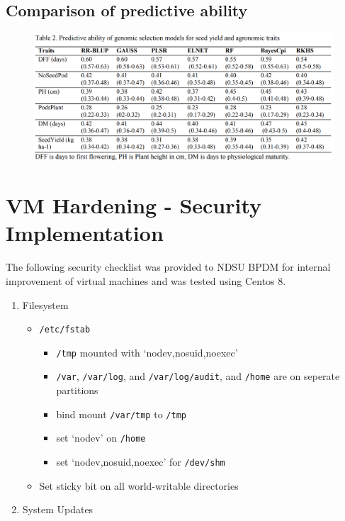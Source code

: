 \documentclass[12pt, letterpaper,oneocolumn]{article}
\begin{document}
\begin{appendices}
\subsection{Comparison of predictive ability}
\begin{center}
	\begin{figure}[H]
	\includegraphics[width=\linewidth]{table2.png}
		\end{figure}
\end{center}


\section{VM Hardening - Security Implementation}
The following security checklist was provided to NDSU BPDM for internal improvement of virtual machines and was tested using Centos 8.

\begin{enumerate}
\def\labelenumi{\arabic{enumi}.}
\item
  Filesystem

  \begin{itemize}
  \item
    \texttt{/etc/fstab}

    \begin{itemize}
    \item
      \texttt{/tmp} mounted with `nodev,nosuid,noexec'
    \item
      \texttt{/var}, \texttt{/var/log}, and \texttt{/var/log/audit}, and
      \texttt{/home} are on seperate partitions
    \item
      bind mount \texttt{/var/tmp} to \texttt{/tmp}
    \item
      set `nodev' on \texttt{/home}
    \item
      set `nodev,nosuid,noexec' for \texttt{/dev/shm}
    \end{itemize}
  \item
    Set sticky bit on all world-writable directories
  \end{itemize}
\item
  System Updates


\end{enumerate}
\end{appendices}
\end{document}
